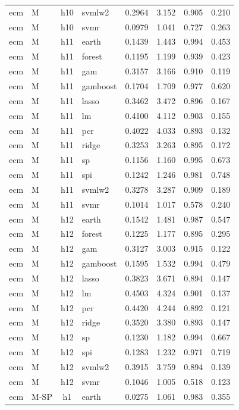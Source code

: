\begin{ThreePartTable}
\begin{longtable}[t]{llclcccc}
ecm & M & h10 & svmlw2 & 0.2964 & 3.152 & 0.905 & 0.210\\
ecm & M & h10 & svmr & 0.0979 & 1.041 & 0.727 & 0.263\\
\addlinespace
ecm & M & h11 & earth & 0.1439 & 1.443 & 0.994 & 0.453\\
ecm & M & h11 & forest & 0.1195 & 1.199 & 0.939 & 0.423\\
ecm & M & h11 & gam & 0.3157 & 3.166 & 0.910 & 0.119\\
ecm & M & h11 & gamboost & 0.1704 & 1.709 & 0.977 & 0.620\\
ecm & M & h11 & lasso & 0.3462 & 3.472 & 0.896 & 0.167\\
ecm & M & h11 & lm & 0.4100 & 4.112 & 0.903 & 0.155\\
ecm & M & h11 & pcr & 0.4022 & 4.033 & 0.893 & 0.132\\
ecm & M & h11 & ridge & 0.3253 & 3.263 & 0.895 & 0.172\\
ecm & M & h11 & sp & 0.1156 & 1.160 & 0.995 & 0.673\\
ecm & M & h11 & spi & 0.1242 & 1.246 & 0.981 & 0.748\\
ecm & M & h11 & svmlw2 & 0.3278 & 3.287 & 0.909 & 0.189\\
ecm & M & h11 & svmr & 0.1014 & 1.017 & 0.578 & 0.240\\
\addlinespace
ecm & M & h12 & earth & 0.1542 & 1.481 & 0.987 & 0.547\\
ecm & M & h12 & forest & 0.1225 & 1.177 & 0.895 & 0.295\\
ecm & M & h12 & gam & 0.3127 & 3.003 & 0.915 & 0.122\\
ecm & M & h12 & gamboost & 0.1595 & 1.532 & 0.994 & 0.479\\
ecm & M & h12 & lasso & 0.3823 & 3.671 & 0.894 & 0.147\\
ecm & M & h12 & lm & 0.4503 & 4.324 & 0.901 & 0.137\\
ecm & M & h12 & pcr & 0.4420 & 4.244 & 0.892 & 0.121\\
ecm & M & h12 & ridge & 0.3520 & 3.380 & 0.893 & 0.147\\
ecm & M & h12 & sp & 0.1230 & 1.182 & 0.994 & 0.667\\
ecm & M & h12 & spi & 0.1283 & 1.232 & 0.971 & 0.719\\
ecm & M & h12 & svmlw2 & 0.3915 & 3.759 & 0.894 & 0.139\\
ecm & M & h12 & svmr & 0.1046 & 1.005 & 0.518 & 0.123\\
\addlinespace
ecm & M-SP & h1 & earth & 0.0275 & 1.061 & 0.983 & 0.355\\

\end{longtable}
\end{ThreePartTable}
